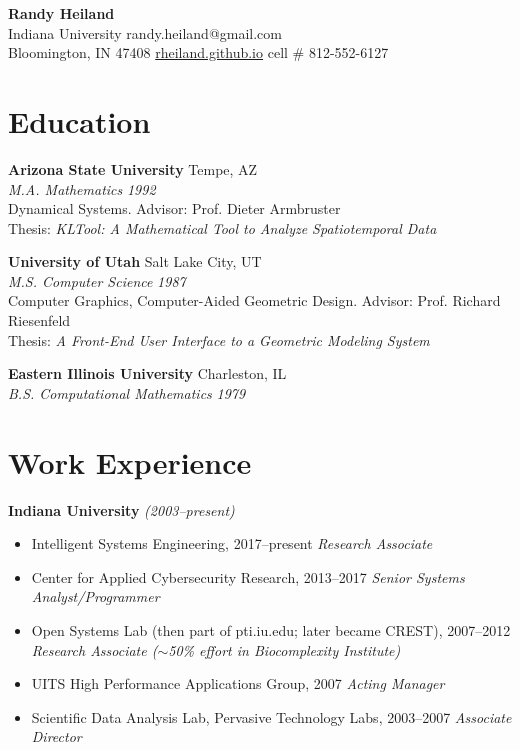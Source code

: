 \documentclass[11pt]{article}
\newcommand{\entry}[4]{%
    \noindent\textbf{#1} \hfill #2\\
    \textit{#3} \hfill \textit{#4}\\[2pt]
}
\begin{document}
\begin{center}
    {\LARGE \textbf{Randy Heiland}}\\[4pt]
    Indiana University \quad\textbullet\quad randy.heiland@gmail.com\\
    Bloomington, IN 47408 \quad\textbullet\quad \href{https://rheiland.github.io}{rheiland.github.io} \quad\textbullet\quad cell \# 812-552-6127
\end{center}

\section*{Education}

\entry{Arizona State University}{Tempe, AZ}{M.A. Mathematics}{1992}
Dynamical Systems. Advisor: Prof. Dieter Armbruster\\
Thesis: \textit{KLTool: A Mathematical Tool to Analyze Spatiotemporal Data}

\vspace{6pt}
\entry{University of Utah}{Salt Lake City, UT}{M.S. Computer Science}{1987}
Computer Graphics, Computer-Aided Geometric Design. Advisor: Prof. Richard Riesenfeld\\
Thesis: \textit{A Front-End User Interface to a Geometric Modeling System}

\vspace{6pt}
\entry{Eastern Illinois University}{Charleston, IL}{B.S. Computational Mathematics}{1979}

\section*{Work Experience}

\noindent\textbf{Indiana University} \hfill \textit{(2003--present)}
\begin{itemize}[leftmargin=*, itemsep=2pt, topsep=4pt]
    \item Intelligent Systems Engineering, 2017--present \hfill \textit{Research Associate}
    \item Center for Applied Cybersecurity Research, 2013--2017 \hfill \textit{Senior Systems Analyst/Programmer}
    \item Open Systems Lab (then part of pti.iu.edu; later became CREST), 2007--2012 \hfill \textit{Research Associate ($\sim$50\% effort in Biocomplexity Institute)}
    \item UITS High Performance Applications Group, 2007 \hfill \textit{Acting Manager}
    \item Scientific Data Analysis Lab, Pervasive Technology Labs, 2003--2007 \hfill \textit{Associate Director}
\end{itemize}
\end{document}
